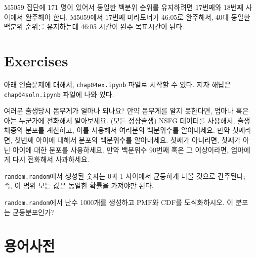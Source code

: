 M5059 집단에 171 명이 있어서 동일한 백분위 순위를 유지하려면 17번째와 18번째 사이에서 완주해야 한다.
M5059에서 17번째 마라토너가 46:05로 완주해서, 40대 동일한 백분위 순위를 유지하는데 
46:05 시간이 완주 목표시간이 된다.


\section{Exercises}

아래 연습문제에 대해서, \verb"chap04ex.ipynb" 파일로 시작할 수 있다.
저자 해답은 \verb"chap04soln.ipynb" 파일에 나와 있다.

\begin{exercise}
여러분 출생당시 몸무게가 얼마나 되나요? 
만약 몸무게를 알지 못한다면, 엄마나 혹은 아는 누군가에 전화해서 알아보세요.
(모든 정상출생) NSFG 데이터를 사용해서, 출생 체중의 분포를 계산하고,
이를 사용해서 여러분의 백분위수를 알아내세요.
만약 첫째라면, 첫번째 아이에 대해서 분포의 백분위수를 알아내세요.
첫째가 아니라면, 첫째가 아닌 아이에 대한 분포를 사용하세요.
만약 백분위수 90번째 혹은 그 이상이라면, 엄마에게 다시 전화해서 사과하세요.


\end{exercise}

\begin{exercise}
{\tt random.random}에서 생성된 숫자는 0과 1 사이에서 균등하게 나올 것으로 간주된다;
즉, 이 범위 모든 값은 동일한 확률을 가져야만 된다.

{\tt random.random}에서 난수 1000개를 생성하고 PMF와 CDF를 도식화하시오.
이 분포는 균등분포인가?


\end{exercise}


\section{용어사전}

